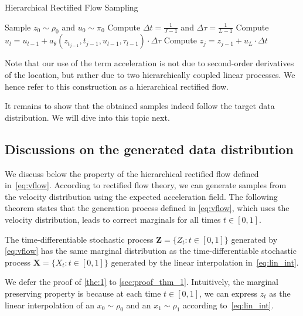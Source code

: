 \begin{algorithm}
\caption{Hierarchical Rectified Flow Sampling}\label{alg:sampling}

Sample $z_0\sim \rho_0$ and $u_0 \sim \pi_0$\;
Compute $\Delta t = \frac{1}{J-1}$ and $\Delta \tau = \frac{1}{L-1}$\; 
      {
         {Compute $u_l = u_{l-1} + a_\theta(z_{t_{j-1}}, t_{j-1}, u_{l-1}, \tau_{l-1}) \cdot \Delta \tau$}      
       Compute $z_j = z_{j-1} + u_L \cdot \Delta t$}
\end{algorithm}



Note that our use of the term acceleration %
is not due to second-order derivatives of the location, but rather due to two hierarchically coupled linear processes. We hence refer to this construction as a hierarchical rectified flow. 

It remains to show that the obtained samples indeed follow the target data distribution. We will dive into this topic next.












\subsection{Discussions on the generated data distribution}
\label{sec:method:theory}
We discuss below the property of the hierarchical rectified flow defined in~\cref{eq:vflow}. According to  rectified flow theory, we can generate samples from the velocity distribution using the expected acceleration field. The following theorem states that the generation process defined in \cref{eq:vflow}, which uses the velocity distribution, leads to correct marginals for all times $t\in[0,1]$. 
\begin{theorem}
\label{the:1}
The time-differentiable stochastic process $\bm{Z} = \{Z_t: t \in [0, 1] \}$ generated by \cref{eq:vflow} has the same marginal distribution as the time-differentiable stochastic process $\bm{X} = \{X_t: t \in [0, 1] \}$ generated by the linear interpolation in~\cref{eq:lin_int}.
\end{theorem}
We defer the proof of \cref{the:1} to  \cref{sec:proof_thm_1}. Intuitively, the marginal preserving property is because at each time $t \in [0, 1]$, we can express $z_t$ as the linear interpolation of an $x_0 \sim \rho_0$ and an $x_1 \sim \rho_1$ according to~\cref{eq:lin_int}. 

